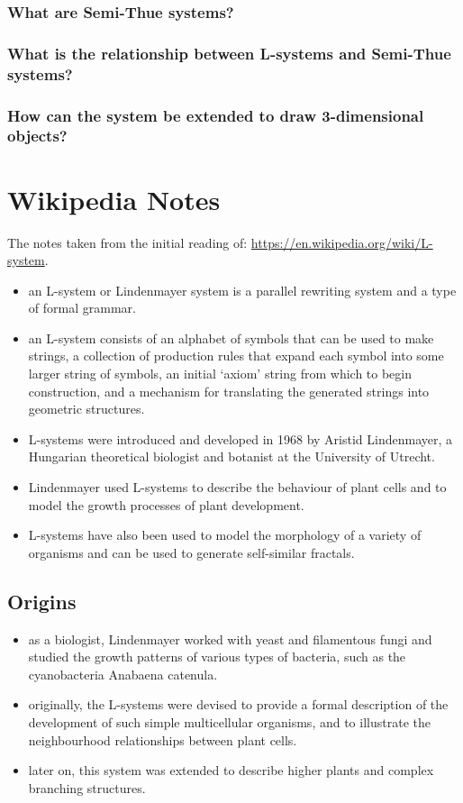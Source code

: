 \documentclass[11pt]{report}
\begin{document}
\subsection{What are Semi-Thue systems?}

\subsection{What is the relationship between L-systems and Semi-Thue systems?}

\subsection{How can the system be extended to draw 3-dimensional objects?}

\chapter{Wikipedia Notes}
The notes taken from the initial reading of:
\url{https://en.wikipedia.org/wiki/L-system}.
\begin{itemize}
    \item an L-system or Lindenmayer system is a parallel rewriting system and a type of
          formal grammar.
    \item an L-system consists of an alphabet of symbols that can be used to make
          strings, a collection of production rules that expand each symbol into some
          larger string of symbols, an initial `axiom' string from which to begin
          construction, and a mechanism for translating the generated strings into
          geometric structures.
    \item L-systems were introduced and developed in 1968 by Aristid Lindenmayer, a
          Hungarian theoretical biologist and botanist at the University of Utrecht.
    \item Lindenmayer used L-systems to describe the behaviour of plant cells and to
          model the growth processes of plant development.
    \item L-systems have also been used to model the morphology of a variety of organisms
          and can be used to generate self-similar fractals.
\end{itemize}

\section{Origins}
\begin{itemize}
    \item as a biologist, Lindenmayer worked with yeast and filamentous fungi and studied
          the growth patterns of various types of bacteria, such as the cyanobacteria
          Anabaena catenula.
    \item originally, the L-systems were devised to provide a formal description of the
          development of such simple multicellular organisms, and to illustrate the
          neighbourhood relationships between plant cells.
    \item later on, this system was extended to describe higher plants and complex
          branching structures.
\end{itemize}

\clearpage
\printbibliography
\end{document}
